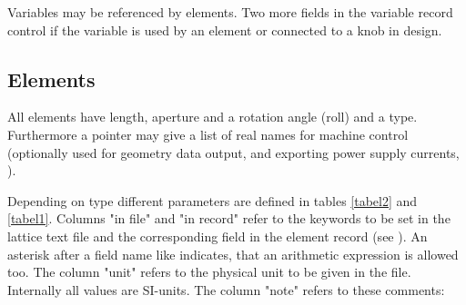 \documentclass[12pt]{article}
\newcommand\code[1]{{\tt #1}}
\newcommand{\unico}[1]{{\color{burntorange}\code{#1}}}
\newcommand{\opagui}[1]{\colorbox{blue!20}{{\color{black}\code{#1}}}}
\newcommand{\ogui}[1]{\hyperref[#1]{\opagui{#1}}}
\newcommand{\todo}[1]{{\color{red} #1}}
\begin{document}
Variables may be referenced by elements. Two more fields in the variable record control if the variable is used by an element or connected to a knob in design.

\subsection{Elements}
All elements have length, aperture and a rotation angle (roll) and a type. 
Furthermore a pointer may give a list of real names for machine control (optionally used for geometry data output, \ogui{opageometry} and exporting power supply currents, \ogui{opacurrents}). 




Depending on type different parameters are defined in tables \ref{tabel2} and \ref{tabel1}. Columns "in file" and "in record" refer to the keywords to be set in the lattice text file and the corresponding field in the element record (see \unico{globlib}). An asterisk after a field name like \unico{l*} indicates, that an arithmetic expression is allowed too.
The column "unit" refers to the physical unit to be given in the file. Internally all values are SI-units. %
The column "note" refers to these comments:
\end{document}
